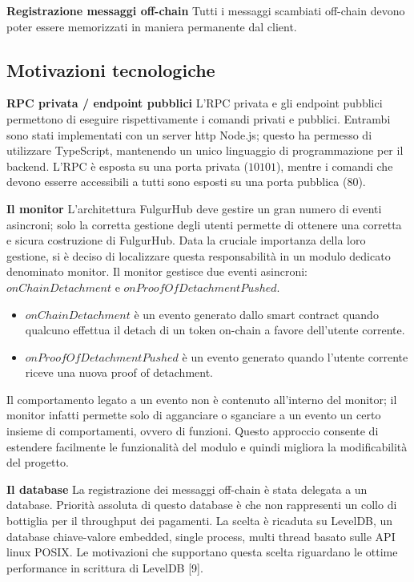 \documentclass[12pt,italian,]{book}
\providecommand{\tightlist}{%
  \setlength{\itemsep}{0pt}\setlength{\parskip}{0pt}}
\begin{document}
\textbf{\textbf{Registrazione messaggi off-chain}} Tutti i messaggi scambiati off-chain devono poter essere memorizzati in maniera permanente dal client.

\hypertarget{motivazioni-tecnologiche-1}{%
\subsection{Motivazioni tecnologiche}\label{motivazioni-tecnologiche-1}}

\textbf{\textbf{RPC privata / endpoint pubblici}} L'RPC privata e gli endpoint pubblici permettono di eseguire rispettivamente i comandi privati e pubblici. Entrambi sono stati implementati con un server http Node.js; questo ha permesso di utilizzare TypeScript, mantenendo un unico linguaggio di programmazione per il backend. L'RPC è esposta su una porta privata (\(10101\)), mentre i comandi che devono esserre accessibili a tutti sono esposti su una porta pubblica (\(80\)).

\textbf{\textbf{Il monitor}} L'architettura FulgurHub deve gestire un gran numero di eventi asincroni; solo la corretta gestione degli utenti permette di ottenere una corretta e sicura costruzione di FulgurHub. Data la cruciale importanza della loro gestione, si è deciso di localizzare questa responsabilità in un modulo dedicato denominato monitor. Il monitor gestisce due eventi asincroni: \(onChainDetachment\) e \(onProofOfDetachmentPushed\).

\begin{itemize}
\tightlist
\item
  \(onChainDetachment\) è un evento generato dallo smart contract quando qualcuno effettua il detach di un token on-chain a favore dell'utente corrente.
\item
  \(onProofOfDetachmentPushed\) è un evento generato quando l'utente corrente riceve una nuova proof of detachment.
\end{itemize}

Il comportamento legato a un evento non è contenuto all'interno del monitor; il monitor infatti permette solo di agganciare o sganciare a un evento un certo insieme di comportamenti, ovvero di funzioni. Questo approccio consente di estendere facilmente le funzionalità del modulo e quindi migliora la modificabilità del progetto.

\textbf{\textbf{Il database}} La registrazione dei messaggi off-chain è stata delegata a un database. Priorità assoluta di questo database è che non rappresenti un collo di bottiglia per il throughput dei pagamenti. La scelta è ricaduta su LevelDB, un database chiave-valore embedded, single process, multi thread basato sulle API linux POSIX. Le motivazioni che supportano questa scelta riguardano le ottime performance in scrittura di LevelDB {[}9{]}.
\end{document}
